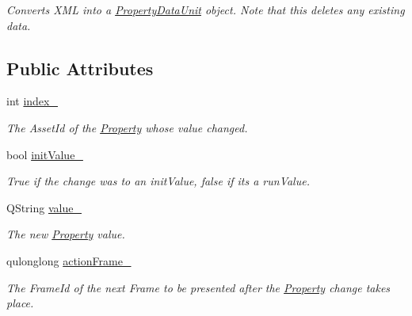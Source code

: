 \begin{DoxyCompactItemize}
\begin{DoxyCompactList}\small\item\em Converts X\-M\-L into a \hyperlink{class_picto_1_1_property_data_unit}{Property\-Data\-Unit} object. Note that this deletes any existing data. \end{DoxyCompactList}\end{DoxyCompactItemize}
\subsection*{Public Attributes}
\begin{DoxyCompactItemize}
\item 
\hypertarget{class_picto_1_1_property_data_unit_a67e14419d8a5e7455a0777027f9f9fb0}{int \hyperlink{class_picto_1_1_property_data_unit_a67e14419d8a5e7455a0777027f9f9fb0}{index\-\_\-}}\label{class_picto_1_1_property_data_unit_a67e14419d8a5e7455a0777027f9f9fb0}

\begin{DoxyCompactList}\small\item\em The Asset\-Id of the \hyperlink{class_picto_1_1_property}{Property} whose value changed. \end{DoxyCompactList}\item 
\hypertarget{class_picto_1_1_property_data_unit_a78f59cd7d6bc3d4388f769e63b74f562}{bool \hyperlink{class_picto_1_1_property_data_unit_a78f59cd7d6bc3d4388f769e63b74f562}{init\-Value\-\_\-}}\label{class_picto_1_1_property_data_unit_a78f59cd7d6bc3d4388f769e63b74f562}

\begin{DoxyCompactList}\small\item\em True if the change was to an init\-Value, false if its a run\-Value. \end{DoxyCompactList}\item 
\hypertarget{class_picto_1_1_property_data_unit_a0c8db6c3bad8d413f45762d78f0b18f9}{Q\-String \hyperlink{class_picto_1_1_property_data_unit_a0c8db6c3bad8d413f45762d78f0b18f9}{value\-\_\-}}\label{class_picto_1_1_property_data_unit_a0c8db6c3bad8d413f45762d78f0b18f9}

\begin{DoxyCompactList}\small\item\em The new \hyperlink{class_picto_1_1_property}{Property} value. \end{DoxyCompactList}\item 
\hypertarget{class_picto_1_1_property_data_unit_a771b69a435485d410c4bdd61c13b6fb9}{qulonglong \hyperlink{class_picto_1_1_property_data_unit_a771b69a435485d410c4bdd61c13b6fb9}{action\-Frame\-\_\-}}\label{class_picto_1_1_property_data_unit_a771b69a435485d410c4bdd61c13b6fb9}

\begin{DoxyCompactList}\small\item\em The Frame\-Id of the next Frame to be presented after the \hyperlink{class_picto_1_1_property}{Property} change takes place. \end{DoxyCompactList}\end{DoxyCompactItemize}

